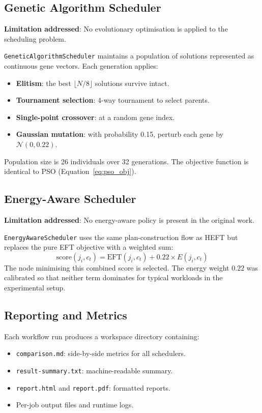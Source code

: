 \documentclass[12pt,a4paper]{article}
\begin{document}
\subsection{Genetic Algorithm Scheduler}

\textbf{Limitation addressed}: No evolutionary optimisation is applied to the scheduling problem.

\texttt{GeneticAlgorithmScheduler} maintains a population of solutions represented as continuous gene vectors. Each generation applies:
\begin{itemize}[leftmargin=1.5cm]
    \item \textbf{Elitism}: the best $\lfloor N/8 \rfloor$ solutions survive intact.
    \item \textbf{Tournament selection}: 4-way tournament to select parents.
    \item \textbf{Single-point crossover}: at a random gene index.
    \item \textbf{Gaussian mutation}: with probability 0.15, perturb each gene by $\mathcal{N}(0, 0.22)$.
\end{itemize}
Population size is 26 individuals over 32 generations. The objective function is identical to PSO (Equation~\ref{eq:pso_obj}).

\subsection{Energy-Aware Scheduler}

\textbf{Limitation addressed}: No energy-aware policy is present in the original work.

\texttt{EnergyAwareScheduler} uses the same plan-construction flow as HEFT but replaces the pure EFT objective with a weighted sum:
\begin{equation}
    \text{score}(j_i, c_t) = \text{EFT}(j_i, c_t) + 0.22 \times E(j_i, c_t)
    \label{eq:energy_score}
\end{equation}
The node minimising this combined score is selected. The energy weight $0.22$ was calibrated so that neither term dominates for typical workloads in the experimental setup.

\subsection{Reporting and Metrics}
Each workflow run produces a workspace directory containing:
\begin{itemize}[leftmargin=1.5cm]
    \item \texttt{comparison.md}: side-by-side metrics for all schedulers.
    \item \texttt{result-summary.txt}: machine-readable summary.
    \item \texttt{report.html} and \texttt{report.pdf}: formatted reports.
    \item Per-job output files and runtime logs.
\end{itemize}
\end{document}
